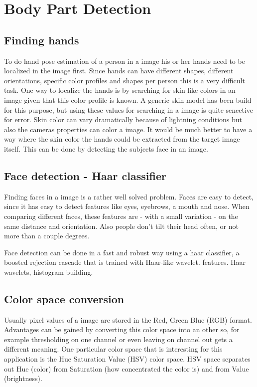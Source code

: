 \chapter{Body Part Detection}
\label{ch:bodyparts}


\section{Finding hands}
To do hand pose estimation of a person in a image his or her hands need to be localized in the image first. Since hands can have different shapes, different orientations, specific color profiles and shapes per person this is a very difficult task. One way to localize the hands is by searching for skin like colors in an image given that this color profile is known. A generic skin model has been build for this purpose\cite{Jones99statisticalcolor}, but using these values for searching in a image is quite sencetive for error. Skin color can vary dramatically because of lightning conditions but also the cameras properties can color a image. It would be much better to have a way where the skin color the hands could be extracted from the target image itself. This can be done by detecting the subjects face in an image.

\section{Face detection - Haar classifier}
Finding faces in a image is a rather well solved problem. Faces are easy to detect, since it has easy to detect features like eyes, eyebrows, a mouth and nose. When comparing different faces, these features are - with a small variation - on the same distance and orientation. Also people don't tilt their head often, or not more than a couple degrees.

Face detection can be done in a fast and robust way using a haar classifier, a boosted rejection cascade that is trained with Haar-like wavelet.
 features\cite{Lienhart02anextended}. Haar wavelets, histogram building.


\section{Color space conversion}
Usually pixel values of a image are stored in the Red, Green Blue (RGB) format. Advantages can be gained by converting this color space into an other so, for example thresholding on one channel or even leaving on channel out gets a different meaning. One particular color space that is interesting for this application is the Hue Saturation Value (HSV) color space. HSV space separates out Hue (color) from Saturation (how concentrated the color is) and from Value (brightness). 

